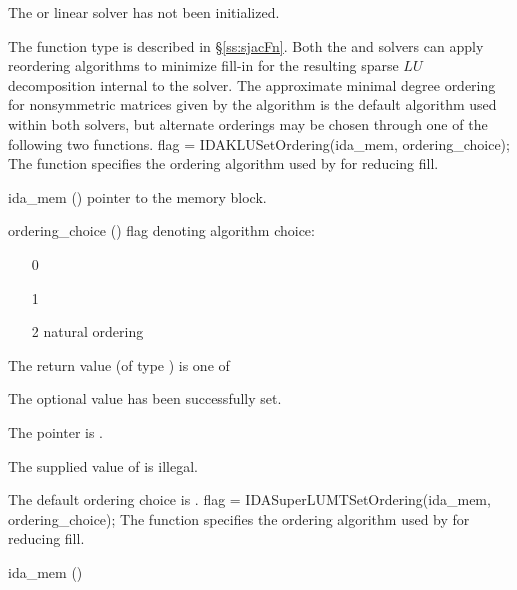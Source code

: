 {{\begin{args}
    The {\idaklu} or {\idasuperlumt} linear solver has not been initialized.
  \end{args}
}
{
  The function type  is described in \S\ref{ss:sjacFn}.
}
Both the {\idaklu} and {\idasuperlumt} solvers can apply reordering
algorithms to minimize fill-in for the resulting sparse $LU$
decomposition internal to the solver.  The approximate minimal degree
ordering for nonsymmetric matrices given by the  algorithm
is the default algorithm used within both solvers, but alternate
orderings may be chosen through one of the following two functions.
{
  flag = IDAKLUSetOrdering(ida\_mem, ordering\_choice);
}
{
  The function  specifies the ordering algorithm
  used by {\idaklu} for reducing fill.
}
{
  \begin{args}
  \item[ida\_mem] ()
    pointer to the {\ida} memory block.
  \item[ordering\_choice] ()
    flag denoting algorithm choice:
    \begin{itemize}
    \item[0] 
    \item[1] 
    \item[2] natural ordering
    \end{itemize}
  \end{args}
}
{
  The return value  (of type ) is one of
  \begin{args}
  \item[\Id{IDASLS\_SUCCESS}] 
    The optional value has been successfully set.
  \item[\Id{IDASLS\_MEM\_NULL}]
    The  pointer is .
  \item[\Id{IDASLS\_ILL\_INPUT}]
    The supplied value of  is illegal.
  \end{args}
}
{
  The default ordering choice is .
}
{
  flag = IDASuperLUMTSetOrdering(ida\_mem, ordering\_choice);
}
{
  The function  specifies the ordering algorithm
  used by {\idasuperlumt} for reducing fill.
}
{
  \begin{args}
  \item[ida\_mem] ()

\end{args}}}
